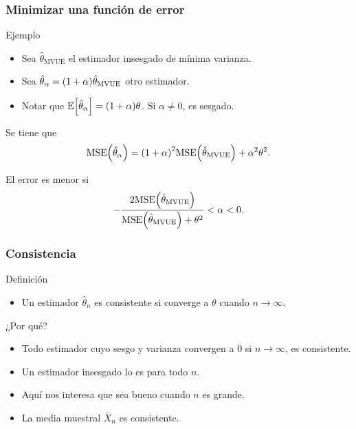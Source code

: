 \documentclass[table]{beamer}
\begin{document}
\begin{frame}
    \frametitle{Minimizar una función de error}
    \begin{block}{Ejemplo}
        \begin{itemize}
            \item Sea $\hat{\theta}_{\text{MVUE}}$ el estimador insesgado de mínima varianza.
            \item Sea $\hat{\theta}_{\alpha} = \parens{1 + \alpha} \hat{\theta}_{\text{MVUE}}$ otro estimador.
            \item Notar que $\expected{\hat{\theta}_{\alpha}} = \parens{1 + \alpha} \theta$. Si $\alpha \neq 0$, es sesgado.
        \end{itemize}
    \end{block}
    \begin{block}{Se tiene que}
        \begin{equation*}
            \text{MSE} \parens{\hat{\theta}_{\alpha}} = \parens{1 + \alpha}^{2} \text{MSE} \parens{\hat{\theta}_{\text{MVUE}}} + \alpha^{2} \theta^{2} .
        \end{equation*}
    \end{block}
    \begin{block}{El error es menor si}
        \begin{equation*}
            - \frac{2 \text{MSE} \parens{\hat{\theta}_{\text{MVUE}}}}{\text{MSE} \parens{\hat{\theta}_{\text{MVUE}}} + \theta^{2}} < \alpha < 0 .
        \end{equation*}
    \end{block}
\end{frame}

\begin{frame}
    \frametitle{Consistencia}
    \begin{block}{Definición}
        \begin{itemize}
            \item Un estimador $\hat{\theta}_{n}$ es consistente si converge a $\theta$ cuando $n \to \infty$.
        \end{itemize}
    \end{block}
    \begin{block}{¿Por qué?}
        \begin{itemize}
            \item Todo estimador cuyo sesgo y varianza convergen a 0 si $n \to \infty$, es consistente.
            \item Un estimador insesgado lo es para todo $n$.
            \item Aquí nos interesa que sea bueno cuando $n$ es grande.
            \item La media muestral $\bar{X}_{n}$ es consistente.
        \end{itemize}
    \end{block}
\end{frame}
\end{document}
